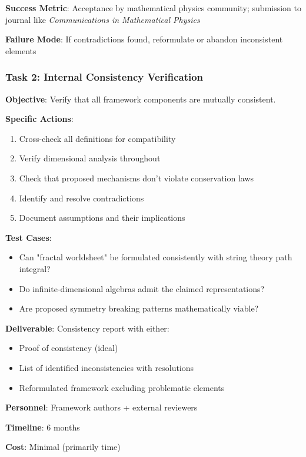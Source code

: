 \textbf{Success Metric}: Acceptance by mathematical physics community; submission to journal like \textit{Communications in Mathematical Physics}

\textbf{Failure Mode}: If contradictions found, reformulate or abandon inconsistent elements

\subsubsection{Task 2: Internal Consistency Verification}

\textbf{Objective}: Verify that all framework components are mutually consistent.

\textbf{Specific Actions}:
\begin{enumerate}
    \item Cross-check all definitions for compatibility
    \item Verify dimensional analysis throughout
    \item Check that proposed mechanisms don't violate conservation laws
    \item Identify and resolve contradictions
    \item Document assumptions and their implications
\end{enumerate}

\textbf{Test Cases}:
\begin{itemize}
    \item Can "fractal worldsheet" be formulated consistently with string theory path integral?
    \item Do infinite-dimensional algebras admit the claimed representations?
    \item Are proposed symmetry breaking patterns mathematically viable?
\end{itemize}

\textbf{Deliverable}: Consistency report with either:
\begin{itemize}
    \item Proof of consistency (ideal)
    \item List of identified inconsistencies with resolutions
    \item Reformulated framework excluding problematic elements
\end{itemize}

\textbf{Personnel}: Framework authors + external reviewers

\textbf{Timeline}: 6 months

\textbf{Cost}: Minimal (primarily time)

